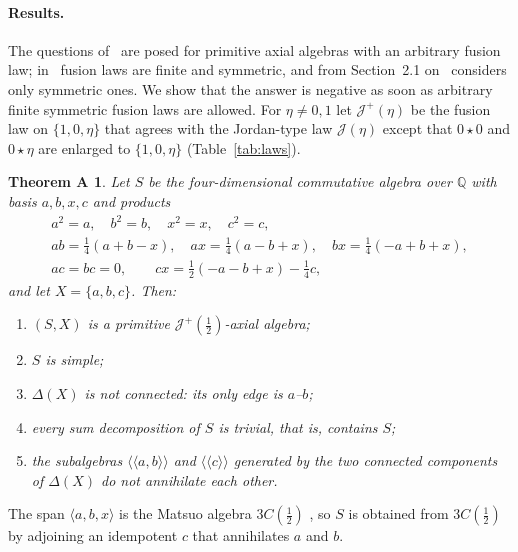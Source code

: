 \documentclass[11pt]{article}
\newtheorem*{thmA}{Theorem A}
\theoremstyle{definition}
\theoremstyle{remark}
\newcommand{\Q}{\mathbb Q}
\newcommand{\cJ}{\mathcal J}
\newcommand{\Jp}{\cJ^{+}}
\newcommand{\lla}{\langle\!\langle}
\newcommand{\rra}{\rangle\!\rangle}
\newcommand{\half}{\tfrac12}
\begin{document}
\paragraph{Results.}
The questions of~\cite{gs,msz} are posed for primitive axial algebras with an
arbitrary fusion law; in~\cite{kms} fusion laws are finite and symmetric,
and from Section~2.1 on~\cite{ms} considers only symmetric ones. We show that
the answer is negative as soon as arbitrary finite symmetric fusion laws are
allowed. For $\eta\ne0,1$ let $\Jp(\eta)$ be the fusion law on
$\{1,0,\eta\}$ that agrees with the Jordan-type law $\cJ(\eta)$ except that
$0\star0$ and $0\star\eta$ are enlarged to $\{1,0,\eta\}$
(Table~\ref{tab:laws}).

\begin{thmA}
Let $S$ be the four-dimensional commutative algebra over $\Q$ with basis
$a,b,x,c$ and products
\begin{gather*}
a^2=a,\quad b^2=b,\quad x^2=x,\quad c^2=c,\\
ab=\tfrac14(a+b-x),\quad ax=\tfrac14(a-b+x),\quad bx=\tfrac14(-a+b+x),\\
ac=bc=0,\qquad cx=\tfrac12(-a-b+x)-\tfrac14c,
\end{gather*}
and let $X=\{a,b,c\}$. Then:
\begin{enumerate}\setlength{\itemsep}{0pt}
\item[(a)] $(S,X)$ is a primitive $\Jp(\half)$-axial algebra;
\item[(b)] $S$ is simple;
\item[(c)] $\Delta(X)$ is not connected: its only edge is $a$--$b$;
\item[(d)] every sum decomposition of $S$ is trivial, that is, contains $S$;
\item[(e)] the subalgebras $\lla a,b\rra$ and $\lla c\rra$ generated by the
 two connected components of $\Delta(X)$ do not annihilate each other.
\end{enumerate}
\end{thmA}

The span $\langle a,b,x\rangle$ is the Matsuo algebra $3C(\half)$
\cite[Def.~2.12]{gs}, so $S$ is obtained from $3C(\half)$ by adjoining an
idempotent $c$ that annihilates $a$ and $b$.
\end{document}
